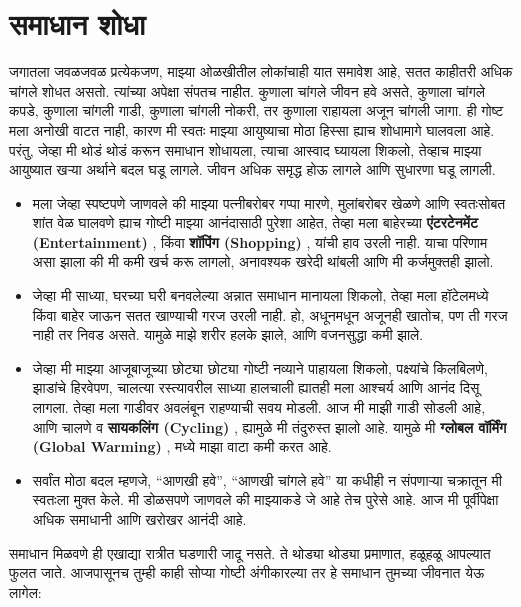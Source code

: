  \chapter{समाधान शोधा}
जगातला जवळजवळ प्रत्येकजण, माझ्या ओळखीतील लोकांचाही यात समावेश आहे, सतत काहीतरी अधिक चांगले शोधत असतो.
 त्यांच्या अपेक्षा संपतच नाहीत. कुणाला चांगले जीवन हवे असते, कुणाला चांगले कपडे, कुणाला चांगली गाडी, कुणाला चांगली नोकरी, तर कुणाला राहायला अजून चांगली जागा.
 ही गोष्ट मला अनोखी वाटत नाही, कारण मी स्वतः माझ्या आयुष्याचा मोठा हिस्सा ह्याच शोधामागे घालवला आहे.
परंतु, जेव्हा मी थोडं थोडं करून समाधान शोधायला, त्याचा आस्वाद घ्यायला शिकलो, तेव्हाच माझ्या आयुष्यात खऱ्या अर्थाने बदल घडू लागले.
 जीवन अधिक समृद्ध होऊ लागले आणि सुधारणा घडू लागली.
\begin{itemize}
 \item मला जेव्हा स्पष्टपणे जाणवले की माझ्या पत्नीबरोबर गप्पा मारणे, मुलांबरोबर खेळणे आणि स्वतःसोबत शांत वेळ घालवणे ह्याच गोष्टी माझ्या आनंदासाठी पुरेशा आहेत,
 तेव्हा मला बाहेरच्या \textbf{एंटरटेनमेंट (Entertainment)} , किंवा \textbf{शॉपिंग (Shopping)} , यांची हाव उरली नाही.
 याचा परिणाम असा झाला की मी कमी खर्च करू लागलो, अनावश्यक खरेदी थांबली आणि मी कर्जमुक्तही झालो.
\item जेव्हा मी साध्या, घरच्या घरी बनवलेल्या अन्नात समाधान मानायला शिकलो,
 तेव्हा मला हॉटेलमध्ये किंवा बाहेर जाऊन सतत खाण्याची गरज उरली नाही.
 हो, अधूनमधून अजूनही खातोच, पण ती गरज नाही तर निवड असते.
 यामुळे माझे शरीर हलके झाले, आणि वजनसुद्धा कमी झाले.
\item जेव्हा मी माझ्या आजूबाजूच्या छोट्या छोट्या गोष्टी नव्याने पाहायला शिकलो,
 पक्ष्यांचे किलबिलणे, झाडांचे हिरवेपण, चालत्या रस्त्यावरील साध्या हालचाली ह्यातही मला आश्चर्य आणि आनंद दिसू लागला.
 तेव्हा मला गाडीवर अवलंबून राहण्याची सवय मोडली.
 आज मी माझी गाडी सोडली आहे, आणि चालणे व \textbf{सायकलिंग (Cycling)} , ह्यामुळे मी तंदुरुस्त झालो आहे.
 यामुळे मी \textbf{ग्लोबल वॉर्मिंग (Global Warming)} , मध्ये माझा वाटा कमी करत आहे.
\item सर्वांत मोठा बदल म्हणजे, ``आणखी हवे'', ``आणखी चांगले हवे'' या कधीही न संपणाऱ्या चक्रातून मी स्वतःला मुक्त केले.
 मी डोळसपणे जाणवले की माझ्याकडे जे आहे तेच पुरेसे आहे.
 आज मी पूर्वीपेक्षा अधिक समाधानी आणि खरोखर आनंदी आहे.
 \end{itemize}
समाधान मिळवणे ही एखाद्या रात्रीत घडणारी जादू नसते.
 ते थोड्या थोड्या प्रमाणात, हळूहळू आपल्यात फुलत जाते.
 आजपासूनच तुम्ही काही सोप्या गोष्टी अंगीकारल्या तर हे समाधान तुमच्या जीवनात येऊ लागेल:
